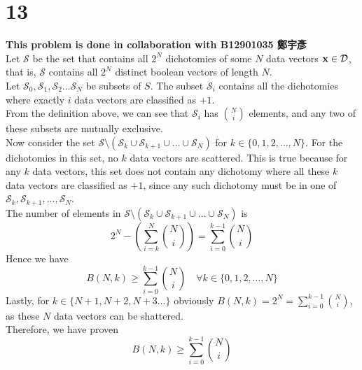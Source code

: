 \documentclass[11pt]{article}
\theoremstyle{definition}
\begin{document}
\section*{13}
\textbf{This problem is done in collaboration with B12901035 鄭宇彥} \\
Let $\mathcal{S}$ be the set that contains all $2^N$ dichotomies of some $N$ data vectors $\vb{x}\in\mathcal{D}$, that is, $\mathcal{S}$ contains all $2^N$ distinct boolean vectors of length $N$. \\ 
Let $\mathcal{S}_0, \mathcal{S}_1, \mathcal{S}_2\dots\mathcal{S}_N$ be subsets of $S$. The subset $\mathcal{S}_i$ contains all the dichotomies where exactly $i$ data vectors are classified as $+1$. \\ 
From the definition above, we can see that $\mathcal{S}_i$ has ${N \choose i}$ elements, and any two of these subsets are mutually exclusive. \\ 
\medskip
Now consider the set $\mathcal{S}\setminus(\mathcal{S}_k\cup\mathcal{S}_{k + 1}\cup\dots\cup\mathcal{S}_N)$ for $k\in\{0, 1, 2,\dots, N\}$. For the dichotomies in this set, no $k$ data vectors are scattered. This is true because for any $k$ data vectors, this set does not contain any dichotomy where all these $k$ data vectors are classified as $+1$, since any such dichotomy must be in one of $\mathcal{S}_k,\mathcal{S}_{k + 1},\dots,\mathcal{S}_N$. \\ 
The number of elements in $\mathcal{S}\setminus(\mathcal{S}_k\cup\mathcal{S}_{k + 1}\cup\dots\cup\mathcal{S}_N)$ is 
\[
  2^N - (\sum^N_{i = k}{N \choose i}) = \sum^{k - 1}_{i = 0}{N \choose i}
\]
Hence we have
\[
  B(N, k) \geq \sum^{k - 1}_{i = 0}{N \choose i} \quad \forall k \in \{0, 1, 2,\dots, N\}
\]
\medskip 
Lastly, for $k\in\{N + 1, N + 2, N + 3\dots\}$ obviously $B(N, k) = 2^N = \sum^{k - 1}_{i = 0}{N \choose i}$, as these $N$ data vectors can be shattered. \\ 
Therefore, we have proven
\[
  B(N, k) \geq \sum^{k - 1}_{i = 0}{N \choose i}
\]
\end{document}
